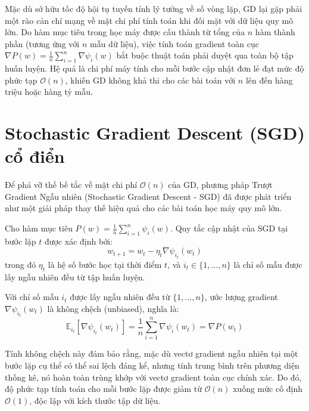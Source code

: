 Mặc dù sở hữu tốc độ hội tụ tuyến tính lý tưởng về số vòng lặp, GD lại gặp phải một rào cản chí mạng về mặt chi phí tính toán khi đối mặt với dữ liệu quy mô lớn. Do hàm mục tiêu trong học máy được cấu thành từ tổng của $n$ hàm thành phần (tương ứng với $n$ mẫu dữ liệu), việc tính toán gradient toàn cục $\nabla P(w) = \frac{1}{n}\sum_{i=1}^n \nabla \psi_i(w)$ bắt buộc thuật toán phải duyệt qua toàn bộ tập huấn luyện. Hệ quả là chi phí máy tính cho mỗi bước cập nhật đơn lẻ đạt mức độ phức tạp $\mathcal{O}(n)$, khiến GD không khả thi cho các bài toán với $n$ lên đến hàng triệu hoặc hàng tỷ mẫu.

\section{Stochastic Gradient Descent (SGD) cổ điển}

Để phá vỡ thế bế tắc về mặt chi phí $\mathcal{O}(n)$ của GD, phương pháp Trượt Gradient Ngẫu nhiên (Stochastic Gradient Descent - SGD) đã được phát triển như một giải pháp thay thế hiệu quả cho các bài toán học máy quy mô lớn.

\begin{definition}
\label{def:sgd_update}
Cho hàm mục tiêu $P(w) = \frac{1}{n}\sum_{i=1}^n \psi_i(w)$. Quy tắc cập nhật của SGD tại bước lặp $t$ được xác định bởi:
\begin{equation}\label{eq:sgd_update_rule}
w_{t+1} = w_t - \eta_t \nabla \psi_{i_t}(w_t)
\end{equation}
trong đó $\eta_t$ là hệ số bước học tại thời điểm $t$, và $i_t \in \{1, \dots, n\}$ là chỉ số mẫu được lấy ngẫu nhiên đều từ tập huấn luyện.
\end{definition}

\begin{proposition}
\label{prop:sgd_unbiased}
Với chỉ số mẫu $i_t$ được lấy ngẫu nhiên đều từ $\{1, \dots, n\}$, ước lượng gradient $\nabla \psi_{i_t}(w_t)$ là không chệch (unbiased), nghĩa là:
\begin{equation}
\mathbb{E}_{i_t} \left[ \nabla \psi_{i_t}(w_t) \right] = \frac{1}{n} \sum_{i=1}^n \nabla \psi_i(w_t) = \nabla P(w_t)
\end{equation}
\end{proposition}

Tính không chệch này đảm bảo rằng, mặc dù vectơ gradient ngẫu nhiên tại một bước lặp cụ thể có thể sai lệch đáng kể, nhưng tính trung bình trên phương diện thống kê, nó hoàn toàn trùng khớp với vectơ gradient toàn cục chính xác. Do đó, độ phức tạp tính toán cho mỗi bước lặp được giảm từ $\mathcal{O}(n)$ xuống mức cố định $\mathcal{O}(1)$, độc lập với kích thước tập dữ liệu.

